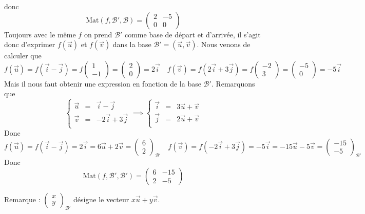 {{donc
$$\textrm{Mat}(f,\mathcal{B}',\mathcal{B}) = \begin{pmatrix} 2 & -5 \\ 0 & 0 \end{pmatrix}$$
Toujours avec le même $f$ on prend $\mathcal{B}'$ comme base de départ et d'arrivée,
il s'agit donc d'exprimer $f(\vec{u})$ et $f(\vec{v})$ dans la base $\mathcal{B}'=(\vec{u},\vec{v})$.
Nous venons de calculer que 
$$f(\vec{u})=f(\vec{i}- \vec{j})=f\begin{pmatrix}1\\-1\end{pmatrix} = \begin{pmatrix}2\\0\end{pmatrix}=2\vec{i}
\quad 
f(\vec{v})=f(2\vec{i}+3\vec{j})=f\begin{pmatrix}-2\\3\end{pmatrix} = \begin{pmatrix}-5\\0\end{pmatrix}=-5\vec{i}$$
Mais il  nous faut obtenir une expression en fonction de la base $\mathcal{B}'$.
Remarquons que 
$$\left\{\begin{array}{lcr}
\vec{u} &=& \vec{i}-\vec{j} \\
\vec{v} &=& -2\vec{i}+3\vec{j} \\           
         \end{array}\right.
\implies
\left\{\begin{array}{lcr}
\vec{i} &=& 3\vec{u}+\vec{v} \\
\vec{j} &=& 2\vec{u}+\vec{v} \\           
         \end{array}\right.$$
Donc 
$$f(\vec{u})=f(\vec{i}- \vec{j})=2\vec{i}=6\vec{u}+2\vec{v} = \begin{pmatrix}6\\2\end{pmatrix}_{\mathcal{B}'}
\quad
f(\vec{v})=f(-2\vec{i}+3\vec{j})=-5\vec{i}=-15\vec{u}-5\vec{v} = \begin{pmatrix}-15\\-5\end{pmatrix}_{\mathcal{B}'}$$
Donc
$$\textrm{Mat}(f,\mathcal{B}',\mathcal{B}') = \begin{pmatrix} 6 & -15 \\ 2 & -5 \end{pmatrix}$$

Remarque :
$\begin{pmatrix}x\\y\end{pmatrix}_{\mathcal{B}'}$
désigne le vecteur $x \vec{u}+y\vec{v}$.
}
}
